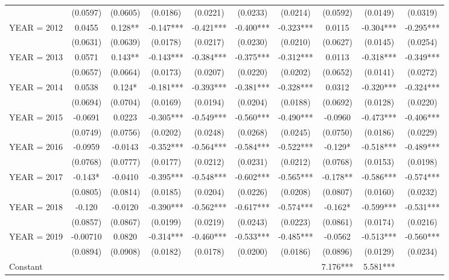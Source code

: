 \begin{tabular}{lccccccccc}
 & (0.0597) & (0.0605) & (0.0186) & (0.0221) & (0.0233) & (0.0214) & (0.0592) & (0.0149) & (0.0319) \\
YEAR = 2012 & 0.0455 & 0.128** & -0.147*** & -0.421*** & -0.400*** & -0.323*** & 0.0115 & -0.304*** & -0.295*** \\
 & (0.0631) & (0.0639) & (0.0178) & (0.0217) & (0.0230) & (0.0210) & (0.0627) & (0.0145) & (0.0254) \\
YEAR = 2013 & 0.0571 & 0.143** & -0.143*** & -0.384*** & -0.375*** & -0.312*** & 0.0113 & -0.318*** & -0.349*** \\
 & (0.0657) & (0.0664) & (0.0173) & (0.0207) & (0.0220) & (0.0202) & (0.0652) & (0.0141) & (0.0272) \\
YEAR = 2014 & 0.0538 & 0.124* & -0.181*** & -0.393*** & -0.381*** & -0.328*** & 0.0312 & -0.320*** & -0.324*** \\
 & (0.0694) & (0.0704) & (0.0169) & (0.0194) & (0.0204) & (0.0188) & (0.0692) & (0.0128) & (0.0220) \\
YEAR = 2015 & -0.0691 & 0.0223 & -0.305*** & -0.549*** & -0.560*** & -0.490*** & -0.0960 & -0.473*** & -0.406*** \\
 & (0.0749) & (0.0756) & (0.0202) & (0.0248) & (0.0268) & (0.0245) & (0.0750) & (0.0186) & (0.0229) \\
YEAR = 2016 & -0.0959 & -0.0143 & -0.352*** & -0.564*** & -0.584*** & -0.522*** & -0.129* & -0.518*** & -0.489*** \\
 & (0.0768) & (0.0777) & (0.0177) & (0.0212) & (0.0231) & (0.0212) & (0.0768) & (0.0153) & (0.0198) \\
YEAR = 2017 & -0.143* & -0.0410 & -0.395*** & -0.548*** & -0.602*** & -0.565*** & -0.178** & -0.586*** & -0.574*** \\
 & (0.0805) & (0.0814) & (0.0185) & (0.0204) & (0.0226) & (0.0208) & (0.0807) & (0.0160) & (0.0232) \\
YEAR = 2018 & -0.120 & -0.0120 & -0.390*** & -0.562*** & -0.617*** & -0.574*** & -0.162* & -0.599*** & -0.531*** \\
 & (0.0857) & (0.0867) & (0.0199) & (0.0219) & (0.0243) & (0.0223) & (0.0861) & (0.0174) & (0.0216) \\
YEAR = 2019 & -0.00710 & 0.0820 & -0.314*** & -0.460*** & -0.533*** & -0.485*** & -0.0562 & -0.513*** & -0.560*** \\
 & (0.0894) & (0.0908) & (0.0182) & (0.0178) & (0.0200) & (0.0186) & (0.0896) & (0.0129) & (0.0234) \\
Constant &  &  &  &  &  &  & 7.176*** & 5.581*** &  \\

\end{tabular}
